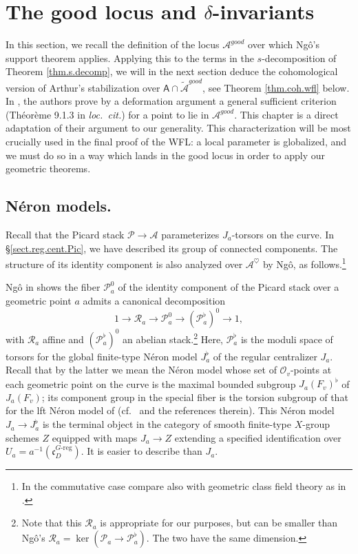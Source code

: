\documentclass[openany]{amsbook}
\theoremstyle{definition}
\theoremstyle{remark}
\numberwithin{equation}{section}
\renewcommand{\O}{\mathcal{O}}
\newcommand{\cA}{\mathcal{A}}
\newcommand{\cR}{\mathcal{R}}
\newcommand{\cP}{\mathcal{P}}
\renewcommand{\-}{\operatorname{-}}
\newcommand{\good}{\mathit{good}}
\newcommand{\ctA}{\widetilde{\cA}}
\newcommand{\bA}{\mathsf{A}}
\newcommand{\fc}{\mathfrak{c}}
\newcommand{\Greg}{G\text{-reg}}
\begin{document}
\chapter{\texorpdfstring{The good locus and $\delta$-invariants}{The good locus and delta-invariants}}\label{sect.good.locus}


In this section, we recall the definition of the locus $\cA^{\good}$ over which Ng\^{o}'s support theorem applies. Applying this to the terms in the $s$-decomposition of Theorem \ref{thm.s.decomp}, we will in the next section deduce the cohomological version of Arthur's stabilization over $\bA \cap \ctA^{\good}$, see Theorem \ref{thm.coh.wfl} below. In \cite[\S 9]{CLII}, the authors prove by a deformation argument a general sufficient criterion (Th\'eor\`eme 9.1.3 in \textit{loc.\ cit.}) for a point to lie in $\cA^{\good}$. This chapter is a direct adaptation of their argument to our generality. This characterization will be most crucially used in the final proof of the WFL: a local parameter is globalized, and we must do so in a way which lands in the good locus in order to apply our geometric theorems.

\section{N\'eron models.}\label{subsect.neron.models}

Recall that the Picard stack $\cP \to \cA$ parameterizes $J_a$-torsors on the curve. In \S \ref{sect.reg.cent.Pic}, we have described its group of connected components. The structure of its identity component is also analyzed over $\cA^{\heartsuit}$ by Ng\^{o}, as follows.\footnote{In the commutative case compare also with geometric class field theory as in \cite{serregeocft}.}

Ng\^{o} in \cite[Proposition 4.8.2]{ngofl} shows the fiber $\cP_a^0$ of the identity component of the Picard stack over a geometric point $a$ admits a canonical decomposition
\begin{equation}\label{eqn.aff.ab.decomp.Pic.stack}
    1 \to \cR_a \to \cP_a^0 \to (\cP_a^{\flat})^0 \to 1,
\end{equation}
with $\cR_a$ affine and $(\cP_a^{\flat})^0$ an abelian stack.\footnote{Note that this $\cR_a$ is appropriate for our purposes, but can be smaller than Ng\^{o}'s $\cR_a = \ker(\cP_a \to \cP_a^{\flat})$. The two have the same dimension.} Here, $\cP_a^{\flat}$ is the moduli space of torsors for the global finite-type N\'eron model $J_a^{\flat}$ of the regular centralizer $J_a$. 
Recall that by the latter we mean the N\'eron model whose set of $\O_v$-points at each geometric point on the curve is the maximal bounded subgroup $J_a(F_v)^{\flat}$ of $J_a(F_v)$; its component group in the special fiber is the torsion subgroup of that for the lft N\'eron model of \cite[Ch.\ 10]{blrneron} (cf.\ \cite[\S 3.b]{pappasrapoport} and the references therein). This N\'eron model $J_a \to J_a^{\flat}$ is the terminal object in the category of smooth finite-type $X$-group schemes $Z$ equipped with maps $J_a \to Z$ extending a specified identification over $U_a = a^{-1}(\fc^{\Greg}_D)$. It is easier to describe than $J_a$. 
\end{document}
